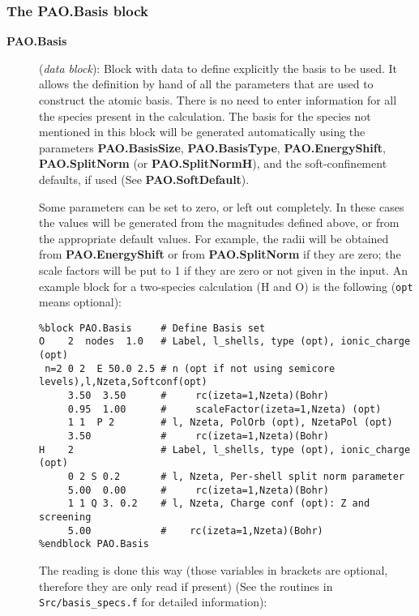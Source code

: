 \documentclass[11pt]{article}
\begin{document}
\subsubsection{The PAO.Basis block}
\begin{description}

\item[{\bf PAO.Basis}] ({\it data block}): 
Block with data to define explicitly the
basis to be used.  It allows the definition by hand of all the
parameters that are used to construct the atomic basis. There is no
need to enter information for all the species present in the
calculation. The basis for the species not mentioned in
this block will be generated automatically using the parameters {\bf
PAO.BasisSize}, {\bf PAO.BasisType}, {\bf PAO.EnergyShift}, {\bf
PAO.SplitNorm} (or {\bf PAO.SplitNormH}), and the soft-confinement
defaults, if used (See {\bf PAO.SoftDefault}).

Some parameters can be set to zero, or
left out completely.  In these cases the values will be generated from the
magnitudes defined above, or from the appropriate default values. For
example, the radii will be obtained from {\bf
PAO.EnergyShift} or from {\bf PAO.SplitNorm} if they are zero; the
scale factors will be put to 1 if they are zero or not given in the
input.  An example block for a two-species calculation (H and O) is
the following ({\tt opt} means optional):

\begin{verbatim}
%block PAO.Basis     # Define Basis set
O    2  nodes  1.0   # Label, l_shells, type (opt), ionic_charge (opt)
 n=2 0 2  E 50.0 2.5 # n (opt if not using semicore levels),l,Nzeta,Softconf(opt)
     3.50  3.50      #     rc(izeta=1,Nzeta)(Bohr)
     0.95  1.00      #     scaleFactor(izeta=1,Nzeta) (opt)
     1 1  P 2        # l, Nzeta, PolOrb (opt), NzetaPol (opt)
     3.50            #     rc(izeta=1,Nzeta)(Bohr)
H    2               # Label, l_shells, type (opt), ionic_charge (opt)
     0 2 S 0.2       # l, Nzeta, Per-shell split norm parameter
     5.00  0.00      #     rc(izeta=1,Nzeta)(Bohr)
     1 1 Q 3. 0.2    # l, Nzeta, Charge conf (opt): Z and screening
     5.00            #    rc(izeta=1,Nzeta)(Bohr)
%endblock PAO.Basis
\end{verbatim}

\noindent
The reading is done this way (those variables in brackets are
optional, therefore they are only read if present) (See
the routines in {\tt Src/basis\_specs.f} for detailed information):


\end{description}
\end{document}
